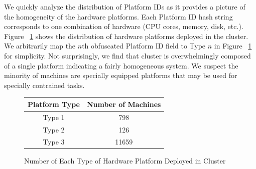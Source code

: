 \documentclass{sig-alternate}
\begin{document}
We quickly analyze the distribution of Platform IDs as it provides a picture of the homogeneity of the hardware platforms.
Each Platform ID hash string corresponds to one combination of hardware (CPU cores, memory, disk, etc.).
Figure ~\ref{platform_dist} shows the distribution of hardware platforms deployed in the cluster.
We arbitrarily map the $n$th obfuscated Platform ID field to Type $n$ in Figure ~\ref{platform_dist} for simplicity.
Not surprisingly, we find that cluster is overwhelmingly composed of a single platform indicating a fairly homogeneous system.
We suspect the minority of machines are specially equipped platforms that may be used for specially contrained tasks.

\begin{figure}
\centering
\begin{tabular}{| c | c |} \hline
Platform Type & Number of Machines\\ \hline
Type 1 & 798\\ \hline
Type 2 & 126\\ \hline
Type 3 & 11659 \\ \hline
\end{tabular}
\label{platform_dist}
\caption{Number of Each Type of Hardware Platform Deployed in Cluster}
\end{figure}




\end{document}
